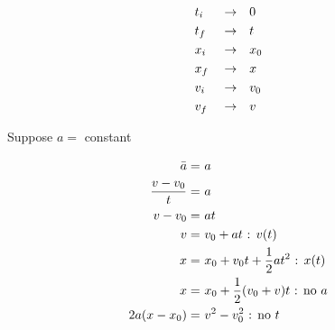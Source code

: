	\begin{align}
		&t_{i}& &\to& &0& \notag \\
		&t_{f}& &\to& &t& \notag \\
		&x_{i}& &\to& &x_{0}& \notag \\
		&x_{f}& &\to& &x& \notag \\
		&v_{i}& &\to& &v_{0}& \notag \\
		&v_{f}& &\to& &v& \notag
	\end{align}

	Suppose $a = $ constant

	\begin{align}
		\bar{a} = \ &a& \notag \\
		\frac{v - v_{0}}{t} = \ &a& \notag \\
		v - v_{0} = \ &at& \notag \\
		v = \ &v_{0} + at \text{ : }v(t)& \\
		x = \ &x_{0} + v_{0}t + \frac{1}{2} at^{2} \text{ : }x(t)& \\
		x = \ &x_{0} + \frac{1}{2} (v_{0} + v)t \text{ : no }a& \\
		2a(x - x_{0}) = \ &v^{2} - v_{0}^{2} \text{ : no }t&
	\end{align}
